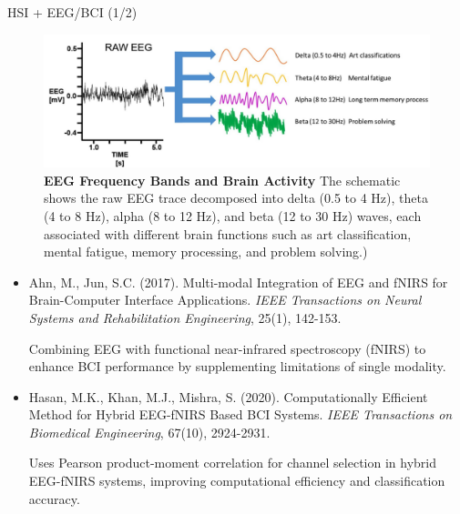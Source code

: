 \documentclass[10pt,svgnames,fragile]{beamer}
\begin{document}
\begin{frame}{HSI + EEG/BCI (1/2)}
\footnotesize
\begin{figure}
    \centering
    \includegraphics[width=0.62\linewidth]{robotor_figure.png}
    \caption{\textbf{EEG Frequency Bands and Brain Activity} The schematic shows the raw EEG trace decomposed into delta (0.5 to 4 Hz), theta (4 to 8 Hz), alpha (8 to 12 Hz), and beta (12 to 30 Hz) waves, each associated with different brain functions such as art classification, mental fatigue, memory processing, and problem solving.)\cite{portillo-laraMindGapStateoftheart2021}}
    \label{fig:robotor_figure}
\end{figure}
\vspace{-0.5cm} %
\begin{itemize}
    \item Ahn, M., Jun, S.C. (2017). Multi-modal Integration of EEG and fNIRS for Brain-Computer Interface Applications. \textit{IEEE Transactions on Neural Systems and Rehabilitation Engineering}, 25(1), 142-153. \href{https://consensus.app/papers/multimodal-integration-eegfnirs-braincomputer-ahn/7783794289e4511c90f93959f447cf57/?utm_source=chatgpt}{\color{blue}{DOI: 10.1109/TNSRE.2016.2557239}}

    {\color{gray}Combining EEG with functional near-infrared spectroscopy (fNIRS) to enhance BCI performance by supplementing limitations of single modality.}

    \item Hasan, M.K., Khan, M.J., Mishra, S. (2020). Computationally Efficient Method for Hybrid EEG-fNIRS Based BCI Systems. \textit{IEEE Transactions on Biomedical Engineering}, 67(10), 2924-2931. \href{https://consensus.app/papers/computationally-efficient-method-hybrid-eegfnirs-based-hasan/1d25bad4992156eab4b1259e11f70aff/?utm_source=chatgpt}{\color{blue}{DOI: 10.1109/TBME.2020.2970158}}

    {\color{gray}Uses Pearson product-moment correlation for channel selection in hybrid EEG-fNIRS systems, improving computational efficiency and classification accuracy.}
\end{itemize}
\end{frame}
\end{document}
